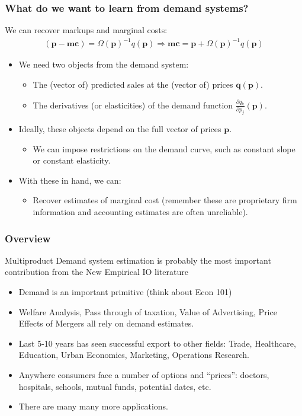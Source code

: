 \documentclass[xcolor=pdftex,dvipsnames,table,mathserif,aspectratio=169]{beamer}
\begin{document}
\begin{frame}
\frametitle{What do we want to learn from demand systems?}
We can recover markups and marginal costs:
\begin{eqnarray*}
(\mathbf{p}-\mathbf{mc}) =  \Omega(\mathbf{p})^{-1} q(\mathbf{p})  \Rightarrow \mathbf{mc}= \mathbf{p} + \Omega(\mathbf{p})^{-1} q(\mathbf{p})
\end{eqnarray*}
\begin{itemize}
\item We need two objects from the demand system:
\begin{itemize}
\item The (vector of) \alert{predicted sales} at the (vector of) prices $\mathbf{q(p)}$.
\item The \alert{derivatives} (or elasticities) of the demand function  $\frac{\partial q_k}{\partial p_j}(\mathbf{p})$.
\end{itemize}
\item Ideally, these objects depend on the full vector of prices $\mathbf{p}$.
\begin{itemize}
\item We can impose restrictions on the demand curve, such as constant slope or constant elasticity.
\end{itemize}
\item With these in hand, we can:
\begin{itemize}
\item Recover estimates of marginal cost (remember these are proprietary firm information and accounting estimates are often unreliable).
\end{itemize}
\end{itemize}
\end{frame}

\begin{frame}
\frametitle{Overview}
Multiproduct Demand system estimation is probably the most important contribution from the New Empirical IO literature
\begin{itemize}
\item Demand is an important primitive (think about Econ 101)
\item Welfare Analysis, Pass through of taxation, Value of Advertising, Price Effects of Mergers all rely on demand estimates.
\item Last 5-10 years has seen successful export to other fields: Trade, Healthcare, Education, Urban Economics, Marketing, Operations Research.
\item Anywhere consumers face a number of options and ``prices'': doctors, hospitals, schools, mutual funds, potential dates, etc.
\item There are many many more applications.
\end{itemize}
\end{frame}
\end{document}
